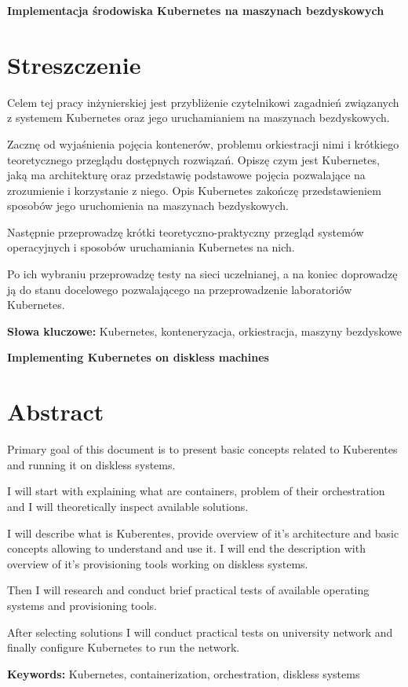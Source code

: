\newpage
\begin{center}
  \large \bf
  Implementacja środowiska Kubernetes na maszynach bezdyskowych
\end{center}

\section*{Streszczenie}

Celem tej pracy inżynierskiej jest przybliżenie czytelnikowi zagadnień
związanych z systemem Kubernetes oraz jego uruchamianiem na maszynach
bezdyskowych.

Zacznę od wyjaśnienia pojęcia kontenerów, problemu orkiestracji nimi i krótkiego
teoretycznego przeglądu dostępnych rozwiązań.
Opiszę czym jest Kubernetes, jaką ma architekturę oraz przedstawię podstawowe
pojęcia pozwalające na zrozumienie i korzystanie z niego.
Opis Kubernetes zakończę przedstawieniem sposobów jego uruchomienia na maszynach
bezdyskowych.

Następnie przeprowadzę krótki teoretyczno-praktyczny przegląd systemów
operacyjnych i sposobów uruchamiania Kubernetes na nich.

Po ich wybraniu przeprowadzę testy na sieci uczelnianej, a na koniec doprowadzę
ją do stanu docelowego pozwalającego na przeprowadzenie laboratoriów Kubernetes.

\bigskip
{\noindent\bf Słowa kluczowe:} Kubernetes, konteneryzacja, orkiestracja, maszyny bezdyskowe

\vskip 2cm


\begin{center}
  \large \bf
  Implementing Kubernetes on diskless machines
\end{center}

\section*{Abstract}

Primary goal of this document is to present basic concepts related to Kuberentes
and running it on diskless systems.

I will start with explaining what are containers, problem of their orchestration
and I will theoretically inspect available solutions.

I will describe what is Kuberentes, provide overview of it's architecture and
basic concepts allowing to understand and use it.
I will end the description with overview of it's provisioning tools working on
diskless systems.

Then I will research and conduct brief practical tests of available operating
systems and provisioning tools.

After selecting solutions I will conduct practical tests on university network
and finally configure Kubernetes to run the network.

\bigskip
{\noindent\bf Keywords:} Kubernetes, containerization, orchestration, diskless systems

\vfill